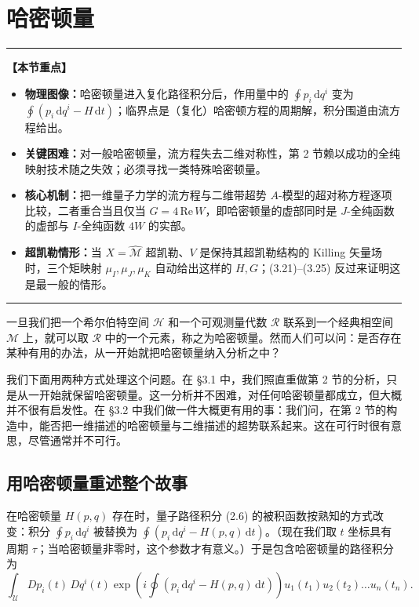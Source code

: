 \documentclass[11pt,a4paper,UTF8]{ctexart}
\theoremstyle{plain}
\theoremstyle{definition}
\newenvironment{keypoints}{%
  \par\addvspace{0.9em}%
  \noindent\begin{minipage}{\linewidth}%
  \color{black!80}\rule{\linewidth}{0.6pt}\par\vspace{2pt}%
  \noindent\textbf{【本节重点】}\par\vspace{2pt}%
  \begin{itemize}[leftmargin=1.6em,itemsep=1pt,topsep=2pt,parsep=0pt]%
}{%
  \end{itemize}\vspace{1pt}\noindent\color{black!80}\rule{\linewidth}{0.6pt}%
  \end{minipage}\par\addvspace{0.9em}%
}
\begin{document}
\section{哈密顿量}

\begin{keypoints}
    \item \textbf{物理图像：}哈密顿量进入复化路径积分后，作用量中的 $\oint p_i\,\mathrm{d}q^i$ 变为 $\oint\left(p_i\,\mathrm{d}q^i-H\,\mathrm{d}t\right)$；临界点是（复化）哈密顿方程的周期解，积分围道由流方程给出。
    \item \textbf{关键困难：}对一般哈密顿量，流方程失去二维对称性，第 2 节赖以成功的全纯映射技术随之失效；必须寻找一类特殊哈密顿量。
    \item \textbf{核心机制：}把一维量子力学的流方程与二维带超势 $A$-模型的超对称方程逐项比较，二者重合当且仅当 $G=4\,\mathrm{Re}\,W$，即哈密顿量的虚部同时是 $J$-全纯函数的虚部与 $I$-全纯函数 $4W$ 的实部。
    \item \textbf{超凯勒情形：}当 $X=\widehat{\mathcal{M}}$ 超凯勒、$V$ 是保持其超凯勒结构的 Killing 矢量场时，三个矩映射 $\mu_I,\mu_J,\mu_K$ 自动给出这样的 $H,G$；(3.21)–(3.25) 反过来证明这是最一般的情形。
\end{keypoints}

一旦我们把一个希尔伯特空间 $\mathcal{H}$ 和一个可观测量代数 $\mathcal{R}$ 联系到一个经典相空间 $\mathcal{M}$ 上，就可以取 $\mathcal{R}$ 中的一个元素，称之为哈密顿量。然而人们可以问：是否存在某种有用的办法，从一开始就把哈密顿量纳入分析之中？

我们下面用两种方式处理这个问题。在 §3.1 中，我们照直重做第 2 节的分析，只是从一开始就保留哈密顿量。这一分析并不困难，对任何哈密顿量都成立，但大概并不很有启发性。在 §3.2 中我们做一件大概更有用的事：我们问，在第 2 节的构造中，能否把一维描述的哈密顿量与二维描述的超势联系起来。这在可行时很有意思，尽管通常并不可行。

\subsection{用哈密顿量重述整个故事}

在哈密顿量 $H(p,q)$ 存在时，量子路径积分 (2.6) 的被积函数按熟知的方式改变：积分 $\oint p_i\,\mathrm{d}q^i$ 被替换为 $\oint\left(p_i\,\mathrm{d}q^i-H(p,q)\,\mathrm{d}t\right)$。（现在我们取 $t$ 坐标具有周期 $\tau$；当哈密顿量非零时，这个参数才有意义。）于是包含哈密顿量的路径积分为
\begin{equation}
    \int_{\mathcal{U}} Dp_i(t)\,Dq^i(t)\exp\left(i\oint\left(p_i\,\mathrm{d}q^i-H(p,q)\,\mathrm{d}t\right)\right)u_1(t_1)u_2(t_2)\dots u_n(t_n).
    \tag{3.1}
\end{equation}
\end{document}

